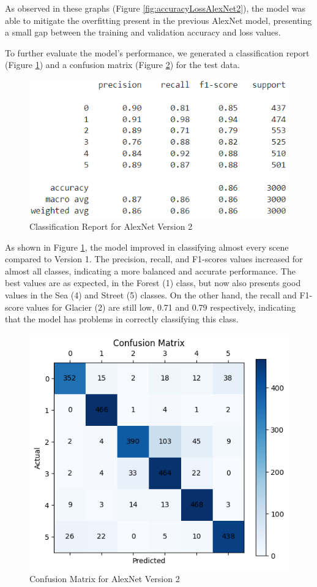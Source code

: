 \documentclass[conference]{IEEEtran}
\begin{document}
As observed in these graphs (Figure \ref{fig:accuracyLossAlexNet2}), the model was able to mitigate the overfitting present in the previous AlexNet model, presenting a small gap between the training and validation accuracy and loss values.


To further evaluate the model's performance, we generated a classification report (Figure \ref{fig:classReportAlex2}) and a confusion matrix (Figure \ref{fig:confusionMatrixAlex2}) for the test data.

\begin{figure}[H]
    \centering
    \includegraphics[width=0.7\linewidth]{images/alex_class_report_2.png}
    \caption{Classification Report for AlexNet Version 2}
    \label{fig:classReportAlex2}
\end{figure}

As shown in Figure \ref{fig:classReportAlex2}, the model improved in classifying almost every scene compared to Version 1. The precision, recall, and F1-scores values increased for almost all classes, indicating a more balanced and accurate performance. The best values are as expected, in the Forest (1) class, but now also presents good values in the Sea (4) and Street (5) classes. On the other hand, the recall and F1-score values for Glacier (2) are still low, 0.71 and 0.79 respectively, indicating that the model has problems in correctly classifying this class.

\begin{figure}[H]
    \centering
    \includegraphics[width=0.7\linewidth]{images/confusion_matrix_alex_2.png}
    \caption{Confusion Matrix for AlexNet Version 2}
    \label{fig:confusionMatrixAlex2}
\end{figure}
\end{document}

